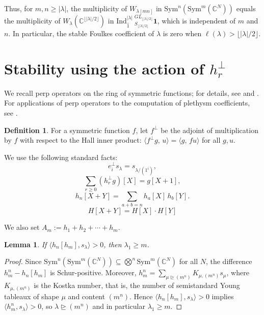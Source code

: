 \documentclass[reqno]{amsart}
\theoremstyle{plain}
\newtheorem{lemma}[theorem]{Lemma}
\theoremstyle{definition}
\newtheorem{definition}[theorem]{Definition}
\theoremstyle{remark}
\theoremstyle{plain}
\newcommand{\C}{\mathbb{C}}
\begin{document}
Thus, for $m,n\ge|\lambda|$, the multiplicity of $W_{\lambda[mn]}$ in
$\mathrm{Sym}^n(\mathrm{Sym}^m(\C^N))$ equals the multiplicity of
$W_\lambda(\C^{\lfloor |\lambda|/2\rfloor})$ in
$\mathrm{Ind}_{\hat{1}}^{|\lambda|}\ _{S_{\lfloor |\lambda|/2\rfloor}}^{GL_{\lfloor |\lambda|/2\rfloor}}\mathbf{1}$,
which is independent of $m$ and $n$. In particular, the stable Foulkes
coefficient of $\lambda$ is zero when $\ell(\lambda)>\lfloor|\lambda|/2\rfloor$.

\section{Stability using the action of \texorpdfstring{$h_r^\perp$}{hr-perp}}\label{stability-using-perp}

We recall perp operators on the ring of symmetric functions; for details, see
\cite[Ch.~I, Sec.~5]{macdonald} and \cite{zabrocki}. For applications of perp
operators to the computation of plethysm coefficients, see \cite{colmenarejo}.

\begin{definition}
For a symmetric function $f$, let $f^\perp$ be the adjoint of multiplication by
$f$ with respect to the Hall inner product:
$\langle f^\perp g,\, u\rangle=\langle g,\, f u\rangle$ for all $g,u$.
\end{definition}

We use the following standard facts:
\begin{equation}\label{e-perp}
e_i^\perp s_\lambda=s_{\lambda/(1^i)},
\end{equation}
\begin{equation}\label{sum-with-perp}
\sum_{r\ge0} (h_r^\perp g)[X]=g[X+1],
\end{equation}
\begin{equation}\label{co-prod-for-h-n}
    h_n[X+Y]=\sum_{a+b=n}h_a[X]\,h_b[Y].
\end{equation}
\begin{equation}
    H[X+Y]=H[X]\cdot H[Y]
\end{equation}

We also set $A_m:=h_1+h_2+\cdots+h_m$.

\begin{lemma}\label{lam-1-ge-m}
If $\langle h_n[h_m],s_\lambda\rangle>0$, then $\lambda_1\ge m$.
\end{lemma}
\begin{proof}
Since $\mathrm{Sym}^n(\mathrm{Sym}^m(\C^N))\subseteq \bigotimes^n{\mathrm{Sym}^m}(\C^N)$
for all $N$, the difference $h_m^n-h_n[h_m]$ is Schur-positive. Moreover,
$h_m^n=\sum_{\mu\trianglerighteq (m^n)}K_{\mu,(m^n)}s_\mu$, where
$K_{\mu,(m^n)}$ is the Kostka number, that is, the number of semistandard
Young tableaux of shape $\mu$ and content $(m^n)$. Hence
$\langle h_n[h_m],s_\lambda\rangle>0$ implies
$\langle h_m^n,s_\lambda\rangle>0$, so
$\lambda\trianglerighteq (m^n)$ and in particular $\lambda_1\ge m$.
\end{proof}
\end{document}
